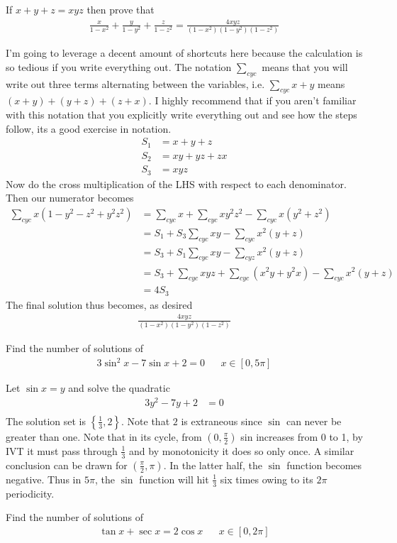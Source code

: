\documentclass{article}
\begin{document}
\begin{question}
	If \(x+y+z =xyz\) then prove that
	\begin{align*}
		\frac{x}{1-x^2} + \frac{y}{1-y^2} + \frac{z}{1-z^2} = \frac{4xyz}{(1-x^2)(1-y^2)(1-z^2)}
	\end{align*}
\end{question}
I'm going to leverage a decent amount of shortcuts here because the calculation is so tedious if you write everything out. The notation \(\sum_{cyc}\) means that you will write out three terms alternating between the variables, i.e. \(\sum_{cyc}x+y\) means \((x+y) + (y+z) + (z+x)\). I highly recommend that if you aren't familiar with this notation that you explicitly write everything out and see how the steps follow, its a good exercise in notation.
\begin{align*}
	S_1 &= x+y+z \\
	S_2 &= xy +yz +zx \\
	S_3 &= xyz
\end{align*}
Now do the cross multiplication of the LHS with respect to each denominator.
Then our numerator becomes
\begin{align*}
	\sum_{cyc} x(1-y^2-z^2+y^2z^2) &= \sum_{cyc}x + \sum_{cyc}xy^2z^2 - \sum_{cyc}x(y^2+z^2) \\
	&= S_1 + S_3\sum_{cyc}xy - \sum_{cyc}x^2(y+z) \\
	&= S_3 + S_1\sum_{cyc}xy - \sum_{cyz}x^2(y+z) \\
	&= S_3 + \sum_{cyc}xyz + \sum_{cyc}(x^2y + y^2x) - \sum_{cyc}x^2(y+z)\\
	&= 4S_3
\end{align*}
The final solution thus becomes, as desired
\begin{align*}
	\frac{4xyz}{(1-x^2)(1-y^2)(1-z^2)}
\end{align*}

\begin{question}
	Find the number of solutions of
	\begin{align*}
		3\sin^2x - 7\sin x +2 = 0 && x\in [0, 5\pi]
	\end{align*}
\end{question}

Let \(\sin x = y\) and solve the quadratic 
\begin{align*}
	3y^2 -7y +2 &= 0 \\
\end{align*}
The solution set is \(\left\{\frac{1}{3}, 2\right\}\). Note that \(2\) is extraneous since \(\sin\) can never be greater than one. Note that in its cycle, from \(\left(0, \frac{\pi}{2}\right)\) sin increases from 0 to 1, by IVT it must pass through \(\frac{1}{3}\) and by monotonicity it does so only once. A similar conclusion can be drawn for \(\left(\frac{\pi}{2}, \pi\right)\). In the latter half, the \(\sin\) function becomes negative. Thus in \(5\pi\), the \(\sin\) function will hit \(\frac{1}{3}\) six times owing to its \(2\pi\) periodicity. 
\begin{question}
	Find the number of solutions of
	\begin{align*}
		\tan x + \sec x = 2\cos x && x \in [0, 2\pi]
	\end{align*}
\end{question}
\end{document}
